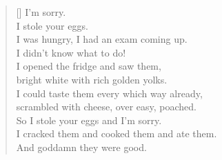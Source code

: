 \documentclass[12pt,oneside,openany]{memoir}
\newcommand{\attrib}[1]{%
\nopagebreak{\raggedleft\footnotesize #1\par}}
\begin{document}
\author{Noah Eisen}
\thispagestyle{empty}

\bigskip
\settowidth{\versewidth}{I cracked them and cooked them and ate them.}
\begin{verse}[\versewidth]
I’m sorry.\\
I stole your eggs.\\
\bigskip
I was hungry, I had an exam coming up.\\
I didn’t know what to do!\\
\bigskip
I opened the fridge and saw them,\\
bright white with rich golden yolks.\\
\bigskip
I could taste them every which way already,\\
scrambled with cheese, over easy, poached.\\
\bigskip
So I stole your eggs and I’m sorry.\\
I cracked them and cooked them and ate them.\\
\bigskip
And goddamn they were good.

\end{verse}
\attrib{Noah Eisen}
\end{document}
